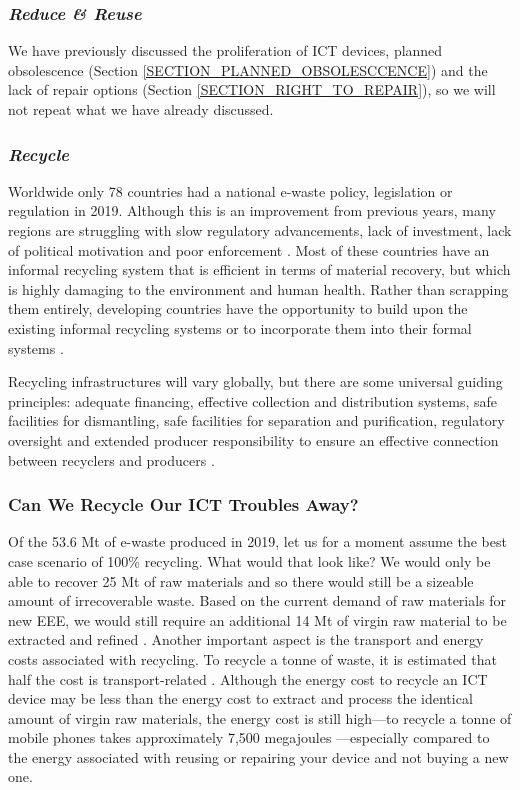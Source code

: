 \documentclass{article}
\begin{document}
\subsubsection*{\textit{Reduce \& Reuse}}
We have previously discussed the proliferation of ICT devices, planned obsolescence (Section \ref{SECTION_PLANNED_OBSOLESCCENCE}) and the lack of repair options (Section \ref{SECTION_RIGHT_TO_REPAIR}), so we will not repeat what we have already discussed.

\subsubsection*{\textit{Recycle}}
Worldwide only 78 countries had a national e-waste policy, legislation or regulation in 2019. Although this is an improvement from previous years, many regions are struggling with slow regulatory advancements, lack of investment, lack of political motivation and poor enforcement \cite{forti2020global}. Most of these countries have an informal recycling system that is efficient in terms of material recovery, but which is highly damaging to the environment and human health. Rather than scrapping them entirely, developing countries have the opportunity to build upon the existing informal recycling systems or to incorporate them into their formal systems \cite{wilson2006role}.

Recycling infrastructures will vary globally, but there are some universal guiding principles: adequate financing, effective collection and distribution systems, safe facilities for dismantling, safe facilities for separation and purification, regulatory oversight and extended producer responsibility to ensure an effective connection between recyclers and producers \cite{braungart2007cradle, bournay2006vital, forti2020global}.


\subsubsection{Can We Recycle Our ICT Troubles Away?}
Of the 53.6 Mt of e-waste produced in 2019, let us for a moment assume the best case scenario of 100\% recycling. What would that look like? We would only be able to recover 25 Mt of raw materials and so there would still be a sizeable amount of irrecoverable waste. Based on the current demand of raw materials for new EEE, we would still require an additional 14 Mt of virgin raw material to be extracted and refined \cite{forti2020global}. Another important aspect is the transport and energy costs associated with recycling. To recycle a tonne of waste, it is estimated that half the cost is transport-related \cite{bournay2006vital}. Although the energy cost to recycle an ICT device may be less than the energy cost to extract and process the identical amount of virgin raw materials, the energy cost is still high---to recycle a tonne of mobile phones takes approximately 7,500 megajoules \cite{navazo2014material}---especially compared to the energy associated with reusing or repairing your device and not buying a new one.
\end{document}
